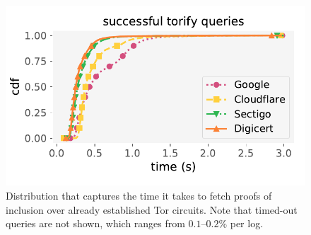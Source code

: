 \begin{figure}
	\centering
	\includegraphics[width=\columnwidth]{../exp/plot/img/incl-dist__torify}
	\caption{%
		Distribution that captures the time it takes to fetch proofs of
		inclusion over already established Tor circuits.  Note that timed-out
		queries are not shown, which ranges from $0.1$--$0.2$\% per log.
	}
	\label{fig:incl-dist}
\end{figure}
